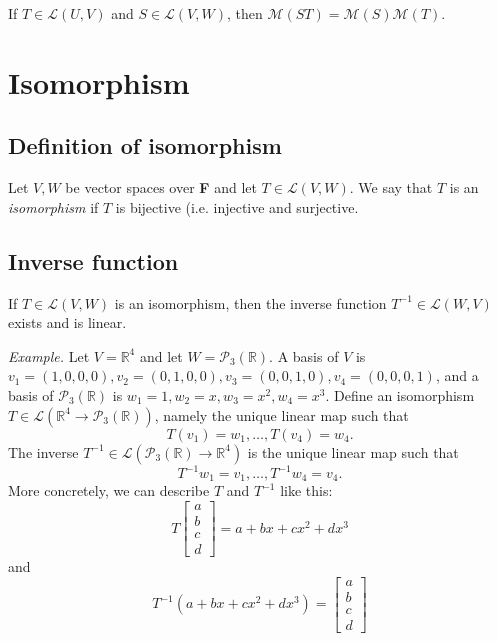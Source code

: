 \documentclass[11pt]{article}
\begin{document}
    If \(T \in \mathcal{L}(U,V)\) and \(S \in \mathcal{L}(V,W)\), then \(\mathcal{M}(ST) = \mathcal{M}(S) \mathcal{M}(T)\). 

    \section{Isomorphism}

    \subsection{Definition of isomorphism}

    Let $V,W$ be vector spaces over \textbf{F} and let \(T \in \mathcal{L}(V,W)\). We say that $T$ is an \emph{isomorphism} if $T$ is bijective (i.e. injective and surjective. 

    \subsection{Inverse function}

    If \(T \in \mathcal{L}(V,W)\) is an isomorphism, then the inverse function \(T^{-1} \in \mathcal{L}(W,V)\) exists and is linear.

    \vspace{1em}

    \emph{Example.} Let \(V = \mathbb{R}^4\) and let \(W = \mathcal{P}_3 (\mathbb{R})\). A basis of $V$ is \(v_1 = (1,0,0,0), v_2 = (0,1,0,0), v_3 = (0,0,1,0), v_4 = (0,0,0,1)\), and a basis of \(\mathcal{P}_3 (\mathbb{R})\) is \(w_1 = 1, w_2 = x, w_3 = x^2, w_4 = x^3\). Define an isomorphism \(T \in \mathcal{L}(\mathbb{R}^4 \rightarrow \mathcal{P}_3 (\mathbb{R}))\), namely the unique linear map such that \[T(v_1) = w_1, \dots, T(v_4) = w_4.\] The inverse \(T^{-1} \in \mathcal{L}(\mathcal{P}_3 (\mathbb{R}) \rightarrow \mathbb{R}^4)\) is the unique linear map such that \[T^{-1} w_1 = v_1, \dots, T^{-1} w_4 = v_4.\] More concretely, we can describe $T$ and $T^{-1}$ like this:
    \begin{equation*}
        T \begin{bmatrix}
            a \\
            b \\
            c \\
            d  
          \end{bmatrix} = a + bx + cx^2 + dx^3
    \end{equation*}
    and
    \begin{equation*}
        T^{-1} (a + bx + cx^2 + dx^3) = \begin{bmatrix}
                                            a \\
                                            b \\
                                            c \\
                                            d
                                        \end{bmatrix}
    \end{equation*}
\end{document}
